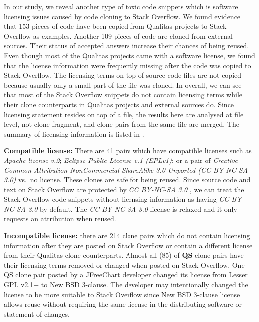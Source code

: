 \documentclass[10pt,journal,compsoc]{IEEEtran}
\begin{document}
In our study, we reveal another type of toxic code snippets which is software
licensing issues caused by code cloning to Stack Overflow. We found evidence that
153 pieces of code have been copied from Qualitas projects to Stack Overflow as
examples. Another 109 pieces of code are cloned from external sources. Their
status of accepted answers increase their chances of being reused. Even though
most of the Qualitas projects came with a software license, we found that the
license information were frequently missing after the code was copied to Stack
Overflow. The licensing terms on top of source code files are not copied because
usually only a small part of the file was cloned. In overall, we can see that
most of the Stack Overflow snippets do not contain licensing terms while their
clone counterparts in Qualitas projects and external sources do. Since licensing
statement resides on top of a file, the results here are analysed at file level,
not clone fragment, and clone pairs from the same file are merged. 
The summary of licensing information is listed in
.

\textbf{Compatible license:} There are 41 pairs which have compatible
licenses such as \emph{Apache license v.2}; \emph{Eclipse Public
	License v.1 (EPLv1)}; or a pair of \emph{Creative
	Common Attribution-NonCommercial-ShareAlike 3.0 Unported (CC
	BY-NC-SA 3.0)} vs.~no license. These clones are safe for being reused. Since source
code and text on Stack Overflow are
protected by \emph{CC BY-NC-SA 3.0}
, we can treat the Stack Overflow code snippets
without licensing information as having \emph{CC BY-NC-SA 3.0} by
default. The \emph{CC BY-NC-SA 3.0} license is relaxed and it only
requests an attribution when reused.

\textbf{Incompatible license:} there are 214 clone pairs which do not contain
licensing information after they are posted on Stack Overflow or contain a
different license from their Qualitas clone counterparts. Almost all (85) of
\textbf{QS} clone pairs have their licensing terms removed or changed when
posted on Stack Overflow. One QS clone pair posted by a JFreeChart developer
changed its license from Lesser GPL v2.1+ to New BSD 3-clause. The
developer may intentionally changed the license to be more suitable to Stack
Overflow since New BSD 3-clause license allows reuse without requiring the same
license in the distributing software or statement of changes. 
\end{document}
